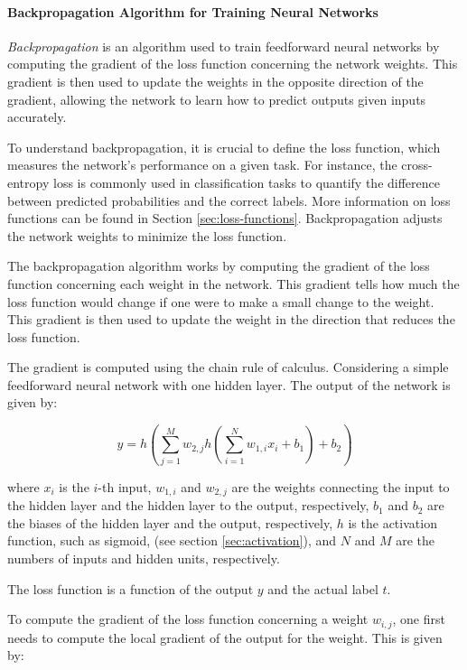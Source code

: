 \paragraph{Backpropagation Algorithm for Training Neural Networks} \label{sec:backpropagation}

\textit{Backpropagation} is an algorithm used to train feedforward neural networks by computing the gradient of the loss function concerning the network weights. This gradient is then used to update the weights in the opposite direction of the gradient, allowing the network to learn how to predict outputs given inputs accurately.

To understand backpropagation, it is crucial to define the loss function, which measures the network's performance on a given task. For instance, the cross-entropy loss is commonly used in classification tasks to quantify the difference between predicted probabilities and the correct labels. More information on loss functions can be found in Section \ref{sec:loss-functions}. Backpropagation adjusts the network weights to minimize the loss function.

The backpropagation algorithm works by computing the gradient of the loss function concerning each weight in the network. This gradient tells how much the loss function would change if one were to make a small change to the weight. This gradient is then used to update the weight in the direction that reduces the loss function.

The gradient is computed using the chain rule of calculus. Considering a simple feedforward neural network with one hidden layer. The output of the network is given by:

\begin{equation}
	y = h(\sum_{j=1}^M w_{2,j} h(\sum_{i=1}^N w_{1,i} x_i + b_1) + b_2)
\end{equation}

where $x_i$ is the $i$-th input, $w_{1, i}$ and $w_{2, j}$ are the weights connecting the input to the hidden layer and the hidden layer to the output, respectively, $b_1$ and $b_2$ are the biases of the hidden layer and the output, respectively, $h$ is the activation function, such as sigmoid, (see section \ref{sec:activation}), and $N$ and $M$ are the numbers of inputs and hidden units, respectively.

The loss function is a function of the output $y$ and the actual label $t$.

To compute the gradient of the loss function concerning a weight $w_{i,j}$, one first needs to compute the local gradient of the output for the weight. This is given by:

